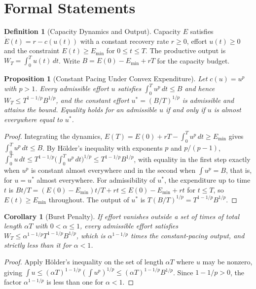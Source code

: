 \documentclass[11pt,letterpaper]{report}
\theoremstyle{plain}
\newtheorem{proposition}[theorem]{Proposition}
\newtheorem{corollary}[theorem]{Corollary}
\theoremstyle{definition}
\newtheorem{definition}[theorem]{Definition}
\theoremstyle{remark}
\begin{document}
\section{Formal Statements}

\begin{definition}[Capacity Dynamics and Output]\label{def:capacity}
Capacity $E$ satisfies $\dot E(t)=r-c(u(t))$ with a constant recovery rate $r\ge0$, effort $u(t)\ge0$ and the constraint $E(t)\ge E_{\min}$ for $0\le t\le T$. The productive output is $W_T=\int_0^Tu(t)\,dt$. Write $B=E(0)-E_{\min}+rT$ for the capacity budget.
\end{definition}

\begin{proposition}[Constant Pacing Under Convex Expenditure]\label{pr:constpacing}
Let $c(u)=u^p$ with $p>1$. Every admissible effort $u$ satisfies $\int_0^Tu^p\,dt\le B$ and hence $W_T\le T^{1-1/p}B^{1/p}$, and the constant effort $u^*=(B/T)^{1/p}$ is admissible and attains the bound. Equality holds for an admissible $u$ if and only if $u$ is almost everywhere equal to $u^*$.
\end{proposition}
\begin{proof}
Integrating the dynamics, $E(T)=E(0)+rT-\int_0^Tu^p\,dt\ge E_{\min}$ gives $\int_0^Tu^p\,dt\le B$. By H\"older's inequality with exponents $p$ and $p/(p-1)$, $\int_0^Tu\,dt\le T^{1-1/p}\bigl(\int_0^Tu^p\,dt\bigr)^{1/p}\le T^{1-1/p}B^{1/p}$, with equality in the first step exactly when $u^p$ is constant almost everywhere and in the second when $\int u^p=B$, that is, for $u=u^*$ almost everywhere. For admissibility of $u^*$, the expenditure up to time $t$ is $Bt/T=(E(0)-E_{\min})t/T+rt\le E(0)-E_{\min}+rt$ for $t\le T$, so $E(t)\ge E_{\min}$ throughout. The output of $u^*$ is $T(B/T)^{1/p}=T^{1-1/p}B^{1/p}$.
\end{proof}

\begin{corollary}[Burst Penalty]\label{co:burst}
If effort vanishes outside a set of times of total length $\alpha T$ with $0<\alpha\le1$, every admissible effort satisfies $W_T\le\alpha^{1-1/p}T^{1-1/p}B^{1/p}$, which is $\alpha^{1-1/p}$ times the constant-pacing output, and strictly less than it for $\alpha<1$.
\end{corollary}
\begin{proof}
Apply H\"older's inequality on the set of length $\alpha T$ where $u$ may be nonzero, giving $\int u\le(\alpha T)^{1-1/p}(\int u^p)^{1/p}\le(\alpha T)^{1-1/p}B^{1/p}$. Since $1-1/p>0$, the factor $\alpha^{1-1/p}$ is less than one for $\alpha<1$.
\end{proof}
\end{document}
